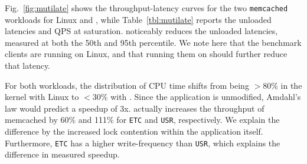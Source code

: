 


Fig.~\ref{fig:mutilate} shows the throughput-latency curves for the
two \texttt{memcached} workloads for Linux and \ix, while
Table~\ref{tbl:mutilate} reports the unloaded latencies and QPS at
saturation.  \ix noticeably reduces the unloaded latencies, measured
at both the 50th and 95th percentile.  We note here that the benchmark
clients are running on Linux, and that running them on \ix should
further reduce that latency. 

For both workloads, the distribution of CPU time shifts from being
$>80\%$ in the kernel with Linux to $<30\%$ with \ix.  Since the
application is unmodified, Amdahl's law would predict a speedup of 3x.
\ix actually increases the throughput of memcached by 60\% and 111\%
for \texttt{ETC} and \texttt{USR}, respectively.  We explain the
difference by the increased lock contention within the application
itself.  Furthermore, \texttt{ETC} has a higher write-frequency than
\texttt{USR}, which explains the difference in measured speedup.  


%

